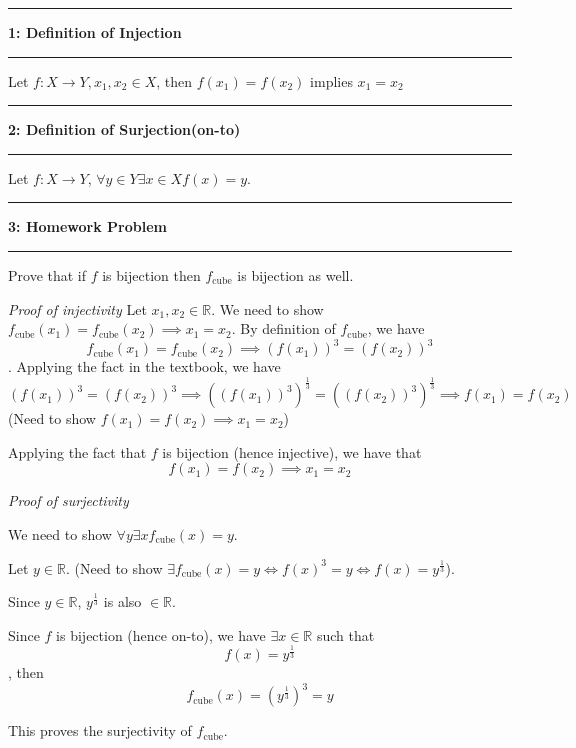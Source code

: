 \documentclass[11pt]{article}
\newcommand\question[2]{\vspace{.25in}\hrule\textbf{#1: #2}\vspace{.5em}\hrule\vspace{.10in}}
\begin{document}
\raggedright
\newcommand\NAME{Carl Kingsford}  %
\newcommand\ANDREWID{ckingsf}     %
\newcommand\HWNUM{1}              %
\newcommand\suminf{\sum_{n=0}^{\infty}}


\question{1}{Definition of Injection}

Let $f: X\to Y, x_1, x_2\in X$, then $f(x_1) = f(x_2)$ implies $x_1 = x_2$

\question{2}{Definition of Surjection(on-to)}

Let $f: X\to Y$, $\forall y\in Y\exists x\in X f(x) = y$.

\question{3}{Homework Problem}

Prove that if $f$ is bijection then $f_{\mathrm{cube}}$ is bijection as well.

\textit{Proof of injectivity} Let $x_1, x_2\in \mathbb{R}$. We need to show $f_{\mathrm{cube}}(x_1) = f_{\mathrm{cube}}(x_2)\implies x_1 = x_2$.
By definition of $f_{\mathrm{cube}}$, we have \[f_{\mathrm{cube}}(x_1) = f_{\mathrm{cube}}(x_2)\implies (f(x_1))^3 = (f(x_2))^3\].
Applying the fact in the textbook, we have 
\[(f(x_1))^3 = (f(x_2))^3 \implies ((f(x_1))^3)^\frac{1}{3} = ((f(x_2))^3)^{\frac{1}{3}}\implies f(x_1) = f(x_2)\]
(Need to show $f(x_1) = f(x_2) \implies x_1 = x_2$)

Applying the fact that $f$ is bijection (hence injective), we have that
\[f(x_1)=f(x_2) \implies x_1 = x_2\]

\textit{Proof of surjectivity}

We need to show $\forall y\exists x f_{\text{cube}}(x)=y$. 

Let $y\in \mathbb{R}$. (Need to show $\exists f_{\text{cube}}(x)=y \iff f(x)^3 = y\iff f(x) = y^{\frac{1}{3}}$).
 
Since $y\in \mathbb{R}$, $y^{\frac{1}{3}}$ is also $\in \mathbb{R}$.

Since $f$ is bijection (hence on-to), we have $\exists x\in \mathbb{R}$ such that \[f(x) = y^{\frac{1}{3}}\],
then 
\[f_{\text{cube}}(x) = \left(y^{\frac{1}{3}}\right)^{3}=y\]

This proves the surjectivity of $f_{\text{cube}}$.
\end{document}
